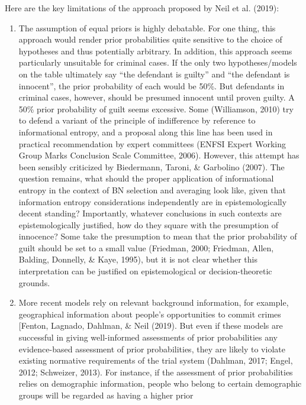 \documentclass[11pt,dvipsnames,enabledeprecatedfontcommands]{scrartcl}
\begin{document}
Here are the key limitations of the approach proposed by Neil et al.
(2019):

\begin{enumerate}
\def\labelenumi{\Alph{enumi}.}
\setcounter{enumi}{4}
\item
  The assumption of equal priors is highly debatable. For one thing,
  this approach would render prior probabilities quite sensitive to the
  choice of hypotheses and thus potentially arbitrary. In addition, this
  approach seems particularly unsuitable for criminal cases. If the only
  two hypotheses/models on the table ultimately say ``the defendant is
  guilty'' and ``the defendant is innocent'', the prior probability of
  each would be 50\%. But defendants in criminal cases, however, should
  be presumed innocent until proven guilty. A 50\% prior probability of
  guilt seems excessive. Some (Williamson, 2010) try to defend a variant
  of the principle of indifference by reference to informational
  entropy, and a proposal along this line has been used in practical
  recommendation by expert committees (ENFSI Expert Working Group Marks
  Conclusion Scale Committee, 2006). However, this attempt has been
  sensibly criticized by Biedermann, Taroni, \& Garbolino (2007). The
  question remains, what should the proper application of informational
  entropy in the context of BN selection and averaging look like, given
  that information entropy considerations independently are in
  epistemologically decent standing? Importantly, whatever conclusions
  in such contexts are epistemologically justified, how do they square
  with the presumption of innocence? Some take the presumption to mean
  that the prior probability of guilt should be set to a small value
  (Friedman, 2000; Friedman, Allen, Balding, Donnelly, \& Kaye, 1995),
  but it is not clear whether this interpretation can be justified on
  epistemological or decision-theoretic grounds.
\item
  More recent models rely on relevant background information, for
  example, geographical information about people's opportunities to
  commit crimes {[}Fenton, Lagnado, Dahlman, \& Neil (2019). But even if
  these models are successful in giving well-informed assessments of
  prior probabilities any evidence-based assessment of prior
  probabilities, they are likely to violate existing normative
  requirements of the trial system (Dahlman, 2017; Engel, 2012;
  Schweizer, 2013). For instance, if the assessment of prior
  probabilities relies on demographic information, people who belong to
  certain demographic groups will be regarded as having a higher prior

\end{enumerate}
\end{document}
